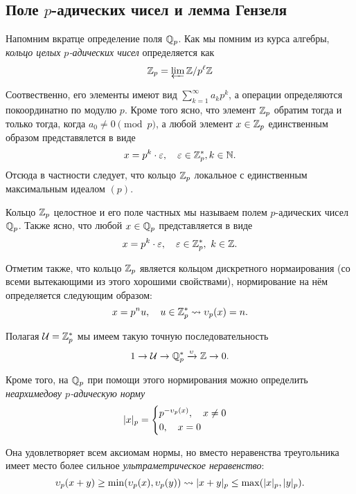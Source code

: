  	\subsection{Поле $p$-адических чисел и лемма Гензеля}

	 Напомним вкратце  определение поля $\mathbb{Q}_{p}$. Как мы помним из курса алгебры,  \emph{кольцо целых $p$-адических чисел} определяется как 
	 \[
	 	\mathbb{Z}_{p} = \varprojlim \mathbb{Z}/p^{\ell}\mathbb{Z}
	 \]

	 Соотвественно, его элементы имеют вид $\sum_{k = 1}^{\infty} a_k p^{k}$, а операции определяются покоординатно по модулю $p$. Кроме того ясно, что элемент $\mathbb{Z}_p$ обратим тогда и только тогда, когда $a_0 \neq 0 \pmod{p}$, а любой элемент $x \in \mathbb{Z}_{p}$ единственным образом представялется в виде 
	 \begin{equation}
	 	x = p^{k} \cdot \varepsilon, \quad \varepsilon \in \mathbb{Z}_{p}^{*}, k \in \mathbb{N}. 
	 \end{equation}
	 Отсюда в частности следует, что кольцо $\mathbb{Z}_{p}$ локальное с единственным максимальным идеалом  $(p)$. 

	 Кольцо $\mathbb{Z}_{p}$ целостное и его поле частных мы называем полем $p$-адических чисел $\mathbb{Q}_{p}$. Также ясно, что любой $x \in \mathbb{Q}_{p}$ представляется в виде 
	 \begin{equation}
	 	x = p^{k} \cdot \varepsilon, \quad \varepsilon \in \mathbb{Z}_{p}^{*}, \ k \in \mathbb{Z}. 
	 \end{equation}

	 Отметим также, что кольцо $\mathbb{Z}_{p}$ является кольцом дискретного нормаирования (со всеми вытекающими из этого хорошими свойствами), нормирование на нём определяется следующим образом: 
	 \[
	 	x = p^n u, \quad u \in \mathbb{Z}_{p}^{*} \rightsquigarrow \upsilon_{p}(x) = n. 
	 \]
	
	 Полагая $\mathcal{U} = \mathbb{Z}_{p}^{*}$ мы имеем такую  точную последовательность 
	 \[
	 	1 \to \mathcal{U} \to \mathbb{Q}_{p}^{*} \xrightarrow{\upsilon} \mathbb{Z} \to 0.
	 \]

	 Кроме того, на $\mathbb{Q}_{p}$ при помощи этого нормирования можно определить \emph{неархимедову $p$-адическую норму}
	 \[
	 	|x|_{p} = \begin{cases} p^{-\upsilon_{p}(x)}, \quad x \neq 0 \\ 0, \quad x = 0 \end{cases}
	 \]

	 Она удовлетворяет всем аксиомам нормы, но вместо неравенства треугольника имеет место более сильное \emph{ультраметрическое неравенство}: 
	 \[
	 	\upsilon_{p}(x + y) \ge \min(\upsilon_{p}(x), \upsilon_{p}(y)) \rightsquigarrow |x + y|_{p} \le \max(|x|_{p}, |y|_{p}).
	 \]

